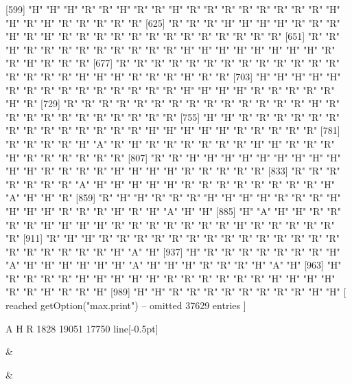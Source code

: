  [599] "H" "H" "H" "R" "R" "H" "R" "R" "H" "R" "R" "R" "R" "R" "R" "R" "R" "H" "H" "R" "H" "R" "R" "R" "R" "R"
 [625] "R" "R" "R" "H" "H" "H" "H" "R" "R" "R" "H" "R" "H" "R" "R" "R" "R" "R" "R" "R" "R" "R" "R" "R" "R" "R"
 [651] "R" "R" "H" "R" "R" "R" "R" "R" "R" "R" "R" "R" "H" "H" "H" "H" "H" "H" "H" "H" "R" "R" "H" "R" "R" "R"
 [677] "R" "R" "R" "R" "R" "R" "R" "R" "R" "R" "R" "R" "R" "R" "R" "R" "R" "H" "H" "H" "R" "R" "R" "H" "R" "R"
 [703] "H" "H" "H" "H" "H" "R" "R" "R" "R" "R" "R" "R" "R" "R" "R" "H" "H" "H" "H" "R" "R" "R" "R" "R" "H" "R"
 [729] "R" "R" "R" "R" "R" "R" "R" "R" "R" "R" "R" "R" "R" "R" "H" "R" "R" "R" "R" "R" "R" "R" "R" "R" "R" "R"
 [755] "H" "H" "R" "R" "R" "R" "R" "R" "R" "R" "R" "R" "R" "R" "R" "R" "H" "H" "H" "H" "H" "R" "R" "R" "R" "R"
 [781] "R" "R" "R" "R" "H" "A" "R" "H" "R" "R" "R" "R" "R" "R" "H" "H" "R" "R" "R" "H" "R" "R" "R" "R" "R" "R"
 [807] "R" "R" "H" "H" "H" "H" "H" "H" "H" "H" "H" "H" "H" "R" "R" "R" "R" "H" "H" "H" "H" "R" "R" "R" "R" "R"
 [833] "R" "R" "R" "R" "R" "R" "R" "A" "H" "H" "H" "H" "H" "R" "R" "R" "R" "R" "R" "R" "R" "H" "A" "H" "H" "R"
 [859] "R" "H" "H" "R" "R" "R" "H" "H" "H" "H" "R" "R" "R" "H" "H" "H" "H" "R" "R" "R" "H" "R" "H" "A" "H" "H"
 [885] "H" "A" "H" "H" "R" "R" "R" "R" "H" "H" "H" "H" "R" "R" "R" "R" "R" "R" "R" "H" "R" "R" "R" "R" "R" "R"
 [911] "R" "H" "H" "R" "R" "R" "R" "R" "R" "R" "R" "R" "R" "R" "R" "R" "R" "R" "R" "R" "R" "R" "R" "H" "A" "H"
 [937] "H" "R" "R" "R" "R" "R" "R" "R" "H" "A" "H" "H" "H" "H" "H" "H" "A" "H" "H" "H" "R" "R" "R" "H" "A" "H"
 [963] "H" "R" "R" "R" "R" "H" "H" "H" "H" "H" "R" "R" "R" "R" "R" "R" "H" "H" "H" "H" "R" "R" "H" "R" "R" "H"
 [989] "H" "H" "R" "R" "R" "R" "R" "R" "R" "R" "H" "H"
 [ reached getOption("max.print") -- omitted 37629 entries ]

    A     H     R 
 1828 19051 17750 
line[-0.5pt]


\hhline{}

 &
 \tabularnewline[-0.5pt]


\hhline{}

 &
 \tabularnewline[-0.5pt]


